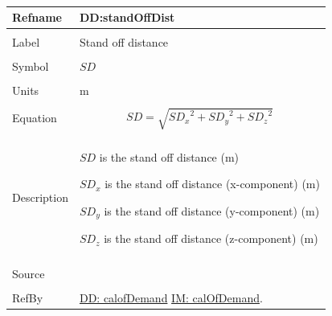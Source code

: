 \documentclass[12pt]{article}
\begin{document}
\par~

\noindent \begin{minipage}{\textwidth}
\begin{tabular}{p{} p{}}
\toprule \textbf{Refname} & \textbf{DD:standOffDist}
\label{DD:standOffDist}
\\ \midrule \\
Label & Stand off distance
\\ \midrule \\
Symbol & $SD$
\\ \midrule \\
Units & m
\\ \midrule \\
Equation & \begin{displaymath}
           SD=\sqrt{{SD_{x}}^{2}+{SD_{y}}^{2}+{SD_{z}}^{2}}
           \end{displaymath}
\\ \midrule \\
Description & \begin{symbDescription}
              \item{$SD$ is the stand off distance (m)}
              \item{${SD_{x}}$ is the stand off distance (x-component) (m)}
              \item{${SD_{y}}$ is the stand off distance (y-component) (m)}
              \item{${SD_{z}}$ is the stand off distance (z-component) (m)}
              \end{symbDescription}
\\ \midrule \\
Source & \cite{astm2009}
\\ \midrule \\
RefBy & \hyperref[DD:calofDemand]{DD: calofDemand} \hyperref[IM:calOfDemand]{IM: calOfDemand}.
\\ \bottomrule \end{tabular}
\end{minipage}
\par~
\end{document}
